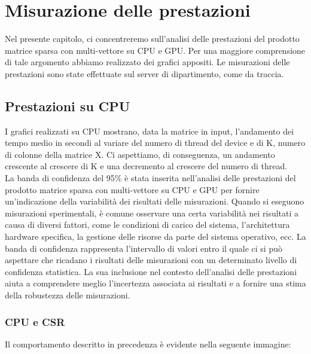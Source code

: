 \documentclass{article}
\begin{document}
\section{Misurazione delle prestazioni}
Nel presente capitolo, ci concentreremo sull'analisi delle prestazioni del prodotto matrice sparsa con multi-vettore su  CPU e GPU. Per una maggiore comprensione di tale argomento abbiamo realizzato dei grafici appositi.  Le misurazioni delle prestazioni sono state effettuate sul server di dipartimento, come da traccia.\\

\subsection{Prestazioni su CPU}
I grafici realizzati su CPU mostrano, data la matrice in input, l'andamento dei tempo medio in secondi al variare del numero di thread del device e di K, numero di colonne della matrice X. Ci aspettiamo, di conseguenza, un andamento crescente al crescere di K e una decremento al crescere del numero di thread. \\
La banda di confidenza del 95\% è stata inserita nell'analisi delle prestazioni del prodotto matrice sparsa con multi-vettore su CPU e GPU per fornire un'indicazione della variabilità dei risultati delle misurazioni. Quando si eseguono misurazioni sperimentali, è comune osservare una certa variabilità nei risultati a causa di diversi fattori, come le condizioni di carico del sistema, l'architettura hardware specifica, la gestione delle risorse da parte del sistema operativo, ecc. La banda di confidenza rappresenta l'intervallo di valori entro il quale ci si può aspettare che ricadano i risultati delle misurazioni con un determinato livello di confidenza statistica. La sua inclusione nel contesto dell'analisi delle prestazioni aiuta a comprendere meglio l'incertezza associata ai risultati e a fornire una stima della robustezza delle misurazioni.\\

\subsubsection{CPU e CSR}
Il comportamento descritto in precedenza è evidente nella seguente immagine:
\end{document}

